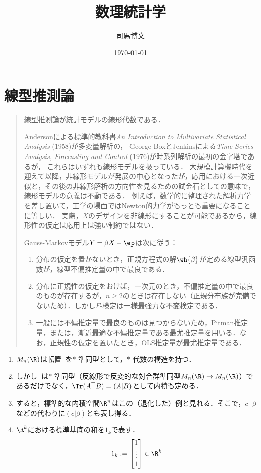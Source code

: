\documentclass[uplatex,dvipdfmx]{jsreport}
\title{数理統計学}
\author{司馬博文}
\date{\today}
\begin{document}
\tableofcontents

\chapter{線型推測論}

\begin{quotation}
    線型推測論が統計モデルの線形代数である．

    Andersonによる標準的教科書\textit{An Introduction to Multivariate Statistical Analysis} (1958)が多変量解析の，
    George BoxとJenkinsによる\textit{Time Series Analysis, Forecasting and Control} (1976)が時系列解析の最初の金字塔であるが，
    これらはいずれも線形モデルを扱っている．
    大規模計算機時代を迎えて以降，非線形モデルが発展の中心となったが，応用における一次近似と，その後の非線形解析の方向性を見るための試金石としての意味で，線形モデルの意義は不動である．
    例えば，数学的に整理された解析力学を差し置いて，工学の場面ではNewton的力学がもっとも重要になることに等しい．
    実際，$X$のデザインを非線形にすることが可能であるから，線形性の仮定は応用上は強い制約ではない．

    Gauss-Markovモデル$Y=\beta X+\ep$は次に従う\cite{竹内啓-考え方}：
    \begin{enumerate}
        \item 分布の仮定を置かないとき，正規方程式の解$\wh{\beta}$が定める線型汎函数が，線型不偏推定量の中で最良である．
        \item 分布に正規性の仮定をおけば，一次元のとき，不偏推定量の中で最良のものが存在するが，$n\ge2$のときは存在しない（正規分布族が完備でないため）．しかし$F$-検定は一様最強力な不変検定である．
        \item 一般には不偏推定量で最良のものは見つからないため，Pitman推定量，または，漸近最適な不偏推定量である最尤推定量を用いる．なお，正規性の仮定を置いたとき，OLS推定量が最尤推定量である．
    \end{enumerate}
\end{quotation}

\begin{notation}\mbox{}
    \begin{enumerate}
        \item $M_n(\R)$は転置${}^\top$を$*$-準同型として，$*$-代数の構造を持つ．
        \item しかし${}^\top$は$*$-準同型（反線形で反変的な対合群準同型$M_n(\R)\to M_n(\R)$）であるだけでなく，$\Tr(A^\top B)=(A|B)$として内積も定める．
        \item すると，標準的な内積空間$\R^n$はこの（退化した）例と見れる．そこで，$c^\top\beta$などの代わりに$(c|\beta)$とも表し得る．
        \item $\R^k$における標準基底の和を$1_k$で表す．
        \[1_k:=\begin{bmatrix}1\\\vdots\\1\end{bmatrix}\in\R^k\]
    \end{enumerate}
\end{notation}
\end{document}
